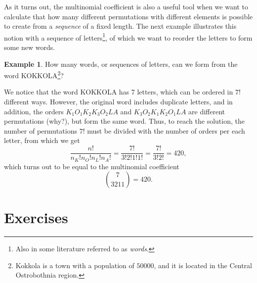 \documentclass[12pt,a4paper,leqno]{report}
\theoremstyle{plain}
\theoremstyle{definition}
\newtheorem{esim}[equation]{Example}
\begin{document}
As it turns out, the multinomial coefficient is also a useful tool when we want to calculate that how many different permutations with different elements is possible to create from a \emph{sequence} of a fixed length. The next example illustrates this notion with a sequence of letters\footnote{Also in some literature referred to as \emph{words}.}, of which we want to reorder the letters to form some new words.

\begin{esim}
How many words, or sequences of letters, can we form from the word KOKKOLA\footnote{Kokkola is a town with a population of $50000$, and it is located in the Central Ostrobothnia region.}?

We notice that the word KOKKOLA has 7 letters, which can be ordered in $7!$ different ways. However, the original word includes duplicate letters, and in addition, the orders $K_1 O_1 K_2 K_3 O_2 L A$ and $K_3 O_2 K_1 K_2 O_1 L A$ are different permutations (why?), but form the same word. Thus, to reach the solution, the number of permutations $7!$ must be divided with the number of orders per each letter, from which we get
\[
\frac{n!}{n_K!n_O!n_L!n_A!} = \frac{7!}{3!2!1!1!} = \frac{7!}{3!2!} = 420,
\]
which turns out to be equal to the multinomial coefficient
\begin{equation}
\binom{7}{3 2 1 1} = 420.
\end{equation}
\end{esim}

\section{Exercises}
\end{document}

